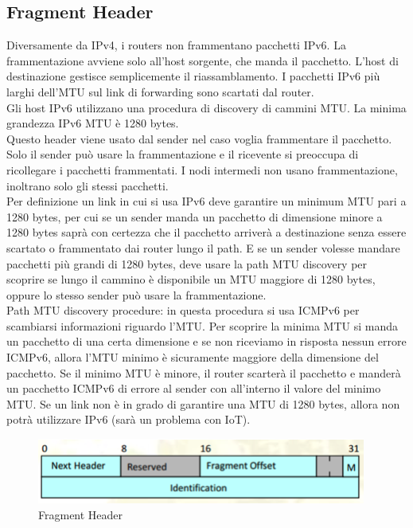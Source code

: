 \documentclass{article}
\begin{document}
\subsection{Fragment Header}
Diversamente da IPv4, i routers non frammentano pacchetti IPv6.
La frammentazione avviene solo all’host sorgente, che manda il pacchetto. L’host di destinazione gestisce semplicemente il riassamblamento. I pacchetti IPv6 più larghi dell’MTU sul link di forwarding sono scartati dal router. \\
Gli host IPv6 utilizzano una procedura di discovery di cammini MTU.
La minima grandezza IPv6 MTU è 1280 bytes. \\ Questo header viene usato dal sender nel caso voglia frammentare il pacchetto. Solo il sender può usare la frammentazione e il ricevente si preoccupa di ricollegare i pacchetti frammentati. I nodi intermedi non usano frammentazione, inoltrano solo gli stessi pacchetti. \\ Per definizione un link in cui si usa IPv6 deve garantire un minimum MTU pari a 1280 bytes, per cui se un sender manda un pacchetto di dimensione minore a 1280 bytes saprà con certezza che il pacchetto arriverà a destinazione senza essere scartato o frammentato dai router lungo il path. E se un sender volesse mandare pacchetti più grandi di 1280 bytes, deve usare la path MTU discovery per scoprire se lungo il cammino è disponibile un MTU maggiore di 1280 bytes, oppure lo stesso sender può usare la frammentazione. \\ Path MTU discovery procedure: in questa procedura si usa ICMPv6 per scambiarsi informazioni riguardo l’MTU. Per scoprire la minima MTU si manda un pacchetto di una certa dimensione e se non riceviamo in risposta nessun errore ICMPv6, allora l’MTU minimo è sicuramente maggiore della dimensione del pacchetto. Se il minimo MTU è minore, il router scarterà il pacchetto e manderà un pacchetto ICMPv6 di errore al sender con all’interno il valore del minimo MTU.
Se un link non è in grado di garantire una MTU di 1280 bytes, allora non potrà utilizzare IPv6 (sarà un problema con IoT).

\begin{figure}[H]
\centering
\includegraphics[scale=0.5]{figures/fragment header.png}
\caption{Fragment Header}
\end{figure}
\end{document}
